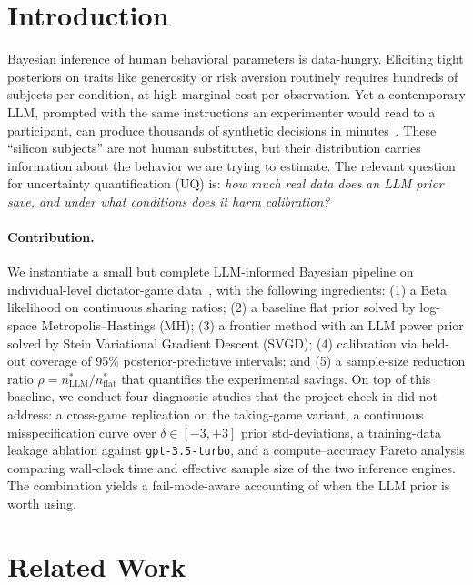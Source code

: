 \documentclass[11pt]{article}
\begin{document}
\section{Introduction}

Bayesian inference of human behavioral parameters is data-hungry. Eliciting tight posteriors
on traits like generosity or risk aversion routinely requires hundreds of subjects per
condition, at high marginal cost per observation. Yet a contemporary LLM, prompted with the
same instructions an experimenter would read to a participant, can produce thousands of
synthetic decisions in minutes~\citep{horton2023large, argyle2023silicon, aher2023using}.
These ``silicon subjects'' are not human substitutes, but their distribution carries
information about the behavior we are trying to estimate. The relevant question for
uncertainty quantification (UQ) is: \emph{how much real data does an LLM prior save, and
under what conditions does it harm calibration?}

\paragraph{Contribution.}
We instantiate a small but complete LLM-informed Bayesian pipeline on individual-level
dictator-game data~\citep{vonblanckenburg2023giving}, with the following ingredients:
(1) a Beta likelihood on continuous sharing ratios; (2) a baseline flat prior solved by
log-space Metropolis--Hastings (MH); (3) a frontier method with an LLM power prior solved
by Stein Variational Gradient Descent (SVGD); (4) calibration via held-out coverage of 95\%
posterior-predictive intervals; and (5) a sample-size reduction ratio
$\rho = n^*_{\mathrm{LLM}}/n^*_{\mathrm{flat}}$ that quantifies the experimental savings.
On top of this baseline, we conduct four diagnostic studies that the project check-in did
not address: a cross-game replication on the taking-game variant, a continuous misspecification
curve over $\delta \in [-3, +3]$ prior std-deviations, a training-data leakage ablation against
\texttt{gpt-3.5-turbo}, and a compute--accuracy Pareto analysis comparing wall-clock time
and effective sample size of the two inference engines. The combination yields a
fail-mode-aware accounting of when the LLM prior is worth using.

\section{Related Work}
\end{document}
